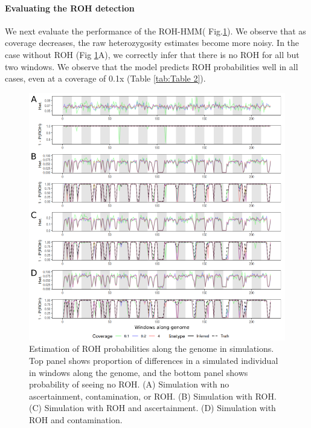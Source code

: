 \documentclass[12pt, letterpaper]{article}
\begin{document}
\paragraph{Evaluating the ROH detection}
We next evaluate the performance of the ROH-HMM( Fig.\ref{fig2:ROH}). We observe that as coverage decreases, the raw heterozygosity estimates become more noisy. In the case without ROH (Fig \ref{fig2:ROH}A), we correctly infer that there is no ROH for all but two windows. We observe that the model predicts ROH probabilities well in all cases, even at a coverage of 0.1x (Table \ref{tab:Table 2}). 


\begin{figure}[h!]
    \includegraphics[width=16cm]{plots/inkscape_finalImg/ROHplot_final.png}
    \centering
    \caption{Estimation of ROH probabilities along the genome in simulations. Top panel shows proportion of differences in a simulated individual in windows along the genome, and the bottom panel shows probability of seeing no ROH. (A) Simulation with no ascertainment, contamination, or ROH. (B) Simulation with ROH. (C) Simulation with ROH and ascertainment. (D) Simulation with ROH and contamination.}
    \label{fig2:ROH}
\end{figure}
\end{document}
